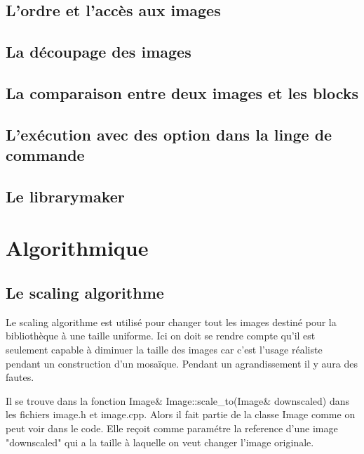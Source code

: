 \documentclass[a4paper]{article}
\begin{document}
\subsection{L'ordre et l'acc\`es aux images}

\subsection{La d\'ecoupage des images}

\subsection{La comparaison entre deux images et les blocks}

\subsection{L'ex\'ecution avec des option dans la linge de commande}

\subsection{Le librarymaker}

\section{Algorithmique}

\subsection{Le scaling algorithme}

Le scaling algorithme est utilis\'e pour changer tout les images destin\'e pour la bibliothèque à une taille uniforme.
Ici on doit se rendre compte qu'il est seulement capable à diminuer la taille des images car c'est l'usage r\'ealiste pendant un construction d'un mosa\"{i}que.  
Pendant un agrandissement il y aura des fautes.

Il se trouve dans la fonction Image\& Image::scale\_to(Image\& downscaled) dans les fichiers image.h et image.cpp.
Alors il fait partie de la classe Image comme on peut voir dans le code.
Elle re\c{c}oit comme param\'etre la reference d'une image "downscaled" qui a la taille \`a laquelle on veut changer l'image originale.
\end{document}
